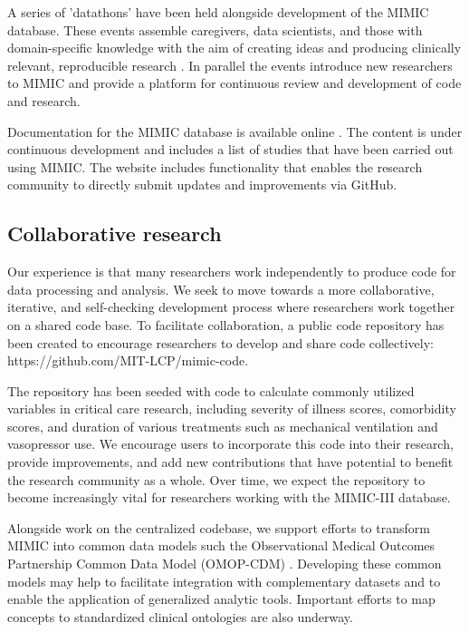 \documentclass[english]{article}
\begin{document}

A series of 'datathons' have been held alongside development of the MIMIC database. These events assemble caregivers, data scientists, and those with domain-specific knowledge with the aim of creating ideas and producing clinically relevant, reproducible research \cite{cite7}. In parallel the events introduce new researchers to MIMIC and provide a platform for continuous review and development of code and research.

Documentation for the MIMIC database is available online \cite{cite-mimic-website}. The content is under continuous development and includes a list of studies that have been carried out using MIMIC. The website includes functionality that enables the research community to directly submit updates and improvements via GitHub.

\subsection*{Collaborative research}

Our experience is that many researchers work independently to produce code for data processing and analysis. We seek to move towards a more collaborative, iterative, and self-checking development process where researchers work together on a shared code base. To facilitate collaboration, a public code repository has been created to encourage researchers to develop and share code collectively: https://github.com/MIT-LCP/mimic-code. 

The repository has been seeded with code to calculate commonly utilized variables in critical care research, including severity of illness scores, comorbidity scores, and duration of various treatments such as mechanical ventilation and vasopressor use. We encourage users to incorporate this code into their research, provide improvements, and add new contributions that have potential to benefit the research community as a whole. Over time, we expect the repository to become increasingly vital for researchers working with the MIMIC-III database.

Alongside work on the centralized codebase, we support efforts to transform MIMIC into common data models such the Observational Medical Outcomes Partnership Common Data Model (OMOP-CDM) \cite{cite8}. Developing these common models may help to facilitate integration with complementary datasets and to enable the application of generalized analytic tools. Important efforts to map concepts to standardized clinical ontologies are also underway.
\end{document}
